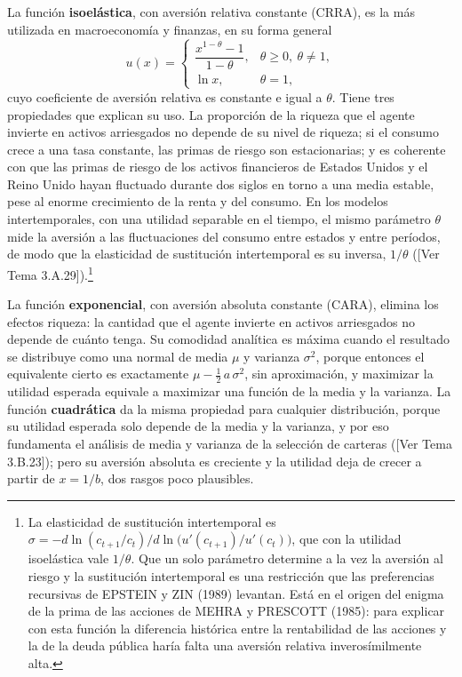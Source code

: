 \documentclass[10pt,a4paper]{article}
\newcommand{\authorfont}[1]{{\fontfamily{EBGaramond-TLF}\selectfont #1}}
\begin{document}
La función \textbf{isoelástica}, con aversión relativa constante (CRRA), es la más utilizada en macroeconomía y finanzas, en su forma general
$$u(x)=\begin{cases}\dfrac{x^{1-\theta}-1}{1-\theta}, & \theta\geq0,\ \theta\neq1,\\[8pt] \ln x, & \theta=1,\end{cases}$$
cuyo coeficiente de aversión relativa es constante e igual a $\theta$. Tiene tres propiedades que explican su uso. La proporción de la riqueza que el agente invierte en activos arriesgados no depende de su nivel de riqueza; si el consumo crece a una tasa constante, las primas de riesgo son estacionarias; y es coherente con que las primas de riesgo de los activos financieros de Estados Unidos y el Reino Unido hayan fluctuado durante dos siglos en torno a una media estable, pese al enorme crecimiento de la renta y del consumo. En los modelos intertemporales, con una utilidad separable en el tiempo, el mismo parámetro $\theta$ mide la aversión a las fluctuaciones del consumo entre estados y entre períodos, de modo que la elasticidad de sustitución intertemporal es su inversa, $1/\theta$ ([\authorfont{Ver Tema 3.A.29}]).\footnote{%
    La elasticidad de sustitución intertemporal es $\sigma=-d\ln(c_{t+1}/c_t)\big/d\ln\big(u'(c_{t+1})/u'(c_t)\big)$, que con la utilidad isoelástica vale $1/\theta$. Que un solo parámetro determine a la vez la aversión al riesgo y la sustitución intertemporal es una restricción que las preferencias recursivas de EPSTEIN y ZIN (1989) levantan. Está en el origen del enigma de la prima de las acciones de MEHRA y PRESCOTT (1985): para explicar con esta función la diferencia histórica entre la rentabilidad de las acciones y la de la deuda pública haría falta una aversión relativa inverosímilmente alta.
}

La función \textbf{exponencial}, con aversión absoluta constante (CARA), elimina los efectos riqueza: la cantidad que el agente invierte en activos arriesgados no depende de cuánto tenga. Su comodidad analítica es máxima cuando el resultado se distribuye como una normal de media $\mu$ y varianza $\sigma^2$, porque entonces el equivalente cierto es exactamente $\mu-\tfrac12\,a\,\sigma^2$, sin aproximación, y maximizar la utilidad esperada equivale a maximizar una función de la media y la varianza. La función \textbf{cuadrática} da la misma propiedad para cualquier distribución, porque su utilidad esperada solo depende de la media y la varianza, y por eso fundamenta el análisis de media y varianza de la selección de carteras ([\authorfont{Ver Tema 3.B.23}]); pero su aversión absoluta es creciente y la utilidad deja de crecer a partir de $x=1/b$, dos rasgos poco plausibles.
\end{document}
